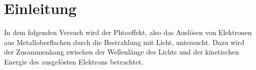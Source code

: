 \section{Einleitung}
\label{sec:einleitung}
In dem folgenden Versuch wird der Phtoeffekt, also das Auslösen von Elektronen aus Metalloberflachen durch die Bestrahlung mit Licht, 
untersucht. Dazu wird der Zusammenhang zwischen der Wellenlänge des Lichts und der kinetischen Energie des ausgelösten Elektrons betrachtet.